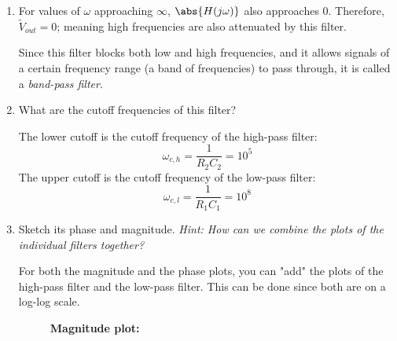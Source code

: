 \begin{enumerate}
{\begin{enumerate}[label=(\roman*)]
  \item For values of $\omega$ approaching $\infty$, $\abs{H(j \omega)}$ also approaches $0$.
    Therefore, $\widetilde{V}_{out} = 0$; meaning high frequencies are also attenuated by this filter. 

    \vspace{0.1 cm} 
    
    Since this filter blocks both low and high frequencies, and it allows signals of a certain frequency range (a band of frequencies) to pass through, it is called a \emph{band-pass filter}.
  \item What are the cutoff frequencies of this filter?

    The lower cutoff is the cutoff frequency of the high-pass filter:
    $$\omega_{c,h} = \frac{1}{R_{2}C_{2}} = 10^{5}$$
    The upper cutoff is the cutoff frequency of the low-pass filter:
    $$\omega_{c,l} = \frac{1}{R_{1}C_{1}} = 10^{8}$$
  \item Sketch its phase and magnitude. \textit{Hint: How can we combine the plots of the individual filters together?}

    For both the magnitude and the phase plots, you can "add" the plots of the high-pass filter and the low-pass filter.
    This can be done since both are on a log-log scale.
    
    \begin{figure}[h]
    \textbf{Magnitude plot:}
    \centering
    \end{figure}


\end{enumerate}}
\end{enumerate}
